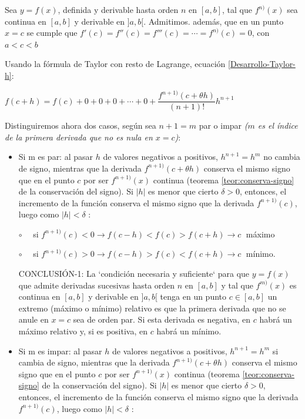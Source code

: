 	 Sea $y=f(x)$, definida y derivable hasta orden $n$ en $[a,b]$, tal que $f^{n)}(x)$ sea continua en $[a,b]$ y derivable en $]a,b[$. Admitimos. además, que en un punto $x=c$ se cumple que $f'(c)=f''(c)=f'''(c)=\cdots = f^{n)}(c)=0$, con $a<c<b$
	 
	 Usando la fórmula de Taylor con resto de Lagrange, ecuación \ref{Desarrollo-Taylor-h}:
	 
	 $f(c+h)=f(c)+0+0+0+\cdots+0+\dfrac {f^{n+1)}(c+\theta h)}{(n+1)!} h^{n+1}$ 
	 
	 Distinguiremos ahora dos casos, según sea $n+1=m$ par o impar \emph{($m$ es el índice de la primera derivada que no es nula en  $x=c$)}:
	 
	 \begin{itemize}
	 	\item Si m es par: al pasar $h$ de valores negativos a positivos, $h^{n+1}=h^m$ no cambia de signo, mientras que la derivada $f^{n+1)}(c+\theta h)$ conserva el mismo signo que en el punto $c$ por ser $f^{n+1)}(x)$ continua (teorema \ref{teor:conserva-signo} de la conservación del signo). Si $|h|$ es menor que cierto $\delta>0$, entonces, el incremento de la función conserva el mismo signo que la derivada $f^{n+1)}(c)$, luego como $|h|< \delta$ :
	 	
	 	$\circ \quad$ si $f^{n+1)}(c)<0 \to f(c-h)<f(c)>f(c+h) \to c\; $ máximo
	 	
	 	$\circ \quad$ si $f^{n+1)}(c)>0 \to f(c-h)>f(c)<f(c+h) \to c\; $ mínimo.

	\vspace{2mm}CONCLUSIÓN-1: La `condición necesaria y suficiente` para que $y=f(x)$ que admite derivadas sucesivas hasta orden $n$ en $[a,b]$ y tal que $f^{m)}(x)$ es continua en $[a,b]$ y derivable en $]a,b[$ tenga en un punto $c \in [a,b]$ un extremo (máximo o mínimo) relativo es que la primera derivada que no se anule en $x=c$ sea de orden par. Si esta derivada es negativa, en $c$ habrá un máximo relativo y, si es positiva, en $c$ habrá un mínimo.
	
	\item Si m es impar: al pasar $h$ de valores negativos a positivos, $h^{n+1}=h^m$ si cambia de signo, mientras que la derivada $f^{n+1)}(c+\theta h)$ conserva el mismo signo que en el punto $c$ por ser $f^{n+1)}(x)$ continua (teorema \ref{teor:conserva-signo} de la conservación del signo). Si $|h|$ es menor que cierto $\delta>0$, entonces, el incremento de la función conserva el mismo signo que la derivada $f^{n+1)}(c)$, luego como $|h|< \delta$ :
	 

\end{itemize}
